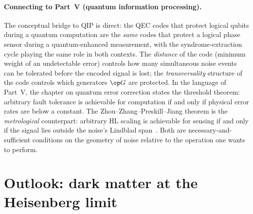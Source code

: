\paragraph{Connecting to Part~V (quantum information processing).}
The conceptual bridge to QIP is direct: the QEC codes that
protect logical qubits during a quantum computation are the
\emph{same} codes that protect a logical phase sensor during a
quantum-enhanced measurement, with the syndrome-extraction
cycle playing the same role in both contexts. The
\emph{distance} of the code (minimum weight of an undetectable
error) controls how many simultaneous noise events can be
tolerated before the encoded signal is lost; the
\emph{transversality} structure of the code controls which
generators $\op G$ are protected. In the language of Part~V,
the chapter on quantum error correction states the threshold
theorem: arbitrary fault tolerance is achievable for
computation if and only if physical error rates are below a
constant. The Zhou--Zhang--Preskill--Jiang theorem is the
\emph{metrological} counterpart: arbitrary HL scaling is
achievable for sensing if and only if the signal lies outside
the noise's Lindblad span~\cite{zhou2018,layden2019}. Both are
necessary-and-sufficient conditions on the geometry of noise
relative to the operation one wants to perform.

\section{Outlook: dark matter at the Heisenberg limit}
\label{sec:dm-hl-outlook}

